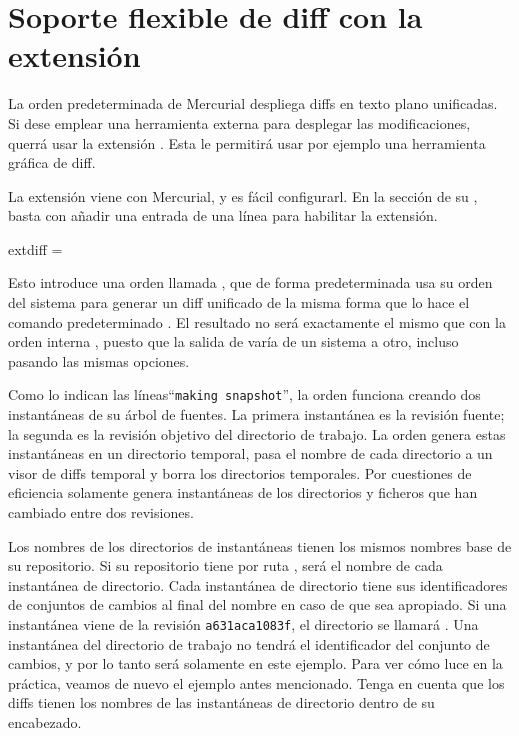 \section{Soporte flexible de diff con la extensión }
\label{sec:hgext:extdiff}

La orden predeterminada  de Mercurial despliega diffs en
texto plano unificadas.
Si dese emplear una herramienta externa para desplegar las
modificaciones, querrá usar la extensión .  Esta le
permitirá usar por ejemplo una herramienta gráfica de diff.

La extensión  viene con Mercurial, y es fácil
configurarl.  En la sección  de su \hgrc,
basta con añadir una entrada de una línea para habilitar la extensión.
\begin{codesample2}
  [extensions]
  extdiff =
\end{codesample2}
Esto introduce una orden llamada , que de
forma predeterminada usa su orden del sistema  para
generar un diff unificado de la misma forma que lo hace el comando
predeterminado .
El resultado no será exactamente el mismo que con la orden interna
, puesto que la salida de  varía de un
sistema a otro, incluso pasando las mismas opciones.

Como lo indican las líneas``\texttt{making snapshot}'', la orden
 funciona creando dos instantáneas de su
árbol de fuentes.  La primera instantánea es la revisión fuente; la
segunda es la revisión objetivo del directorio de trabajo.  La orden
 genera estas instantáneas en un directorio
temporal, pasa el nombre de cada directorio a un visor de diffs
temporal y borra los directorios temporales.  Por cuestiones de
eficiencia solamente genera instantáneas de los directorios y ficheros
que han cambiado entre dos revisiones.

Los nombres de los directorios de instantáneas tienen los mismos
nombres base de su repositorio.  Si su repositorio tiene por ruta
,  será el nombre de cada
instantánea de directorio.  Cada instantánea de directorio tiene sus
identificadores de conjuntos de cambios al final del nombre en caso de
que sea apropiado.  Si una instantánea viene de la revisión
\texttt{a631aca1083f}, el directorio se llamará
.  Una instantánea del directorio de trabajo
no tendrá el identificador del conjunto de cambios, y por lo tanto
será solamente  en este ejemplo.  Para ver cómo luce en
la práctica, veamos de nuevo el ejemplo 
antes mencionado.  Tenga en cuenta que los diffs tienen los nombres de
las instantáneas de directorio dentro de su encabezado.

